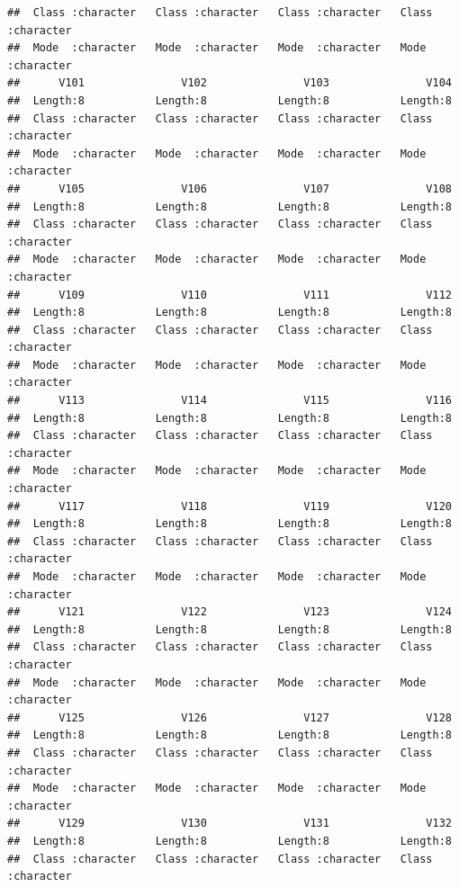 \documentclass[
]{article}
\begin{document}
\begin{verbatim}
##  Class :character   Class :character   Class :character   Class :character  
##  Mode  :character   Mode  :character   Mode  :character   Mode  :character  
##      V101               V102               V103               V104          
##  Length:8           Length:8           Length:8           Length:8          
##  Class :character   Class :character   Class :character   Class :character  
##  Mode  :character   Mode  :character   Mode  :character   Mode  :character  
##      V105               V106               V107               V108          
##  Length:8           Length:8           Length:8           Length:8          
##  Class :character   Class :character   Class :character   Class :character  
##  Mode  :character   Mode  :character   Mode  :character   Mode  :character  
##      V109               V110               V111               V112          
##  Length:8           Length:8           Length:8           Length:8          
##  Class :character   Class :character   Class :character   Class :character  
##  Mode  :character   Mode  :character   Mode  :character   Mode  :character  
##      V113               V114               V115               V116          
##  Length:8           Length:8           Length:8           Length:8          
##  Class :character   Class :character   Class :character   Class :character  
##  Mode  :character   Mode  :character   Mode  :character   Mode  :character  
##      V117               V118               V119               V120          
##  Length:8           Length:8           Length:8           Length:8          
##  Class :character   Class :character   Class :character   Class :character  
##  Mode  :character   Mode  :character   Mode  :character   Mode  :character  
##      V121               V122               V123               V124          
##  Length:8           Length:8           Length:8           Length:8          
##  Class :character   Class :character   Class :character   Class :character  
##  Mode  :character   Mode  :character   Mode  :character   Mode  :character  
##      V125               V126               V127               V128          
##  Length:8           Length:8           Length:8           Length:8          
##  Class :character   Class :character   Class :character   Class :character  
##  Mode  :character   Mode  :character   Mode  :character   Mode  :character  
##      V129               V130               V131               V132          
##  Length:8           Length:8           Length:8           Length:8          
##  Class :character   Class :character   Class :character   Class :character  

\end{verbatim}
\end{document}
